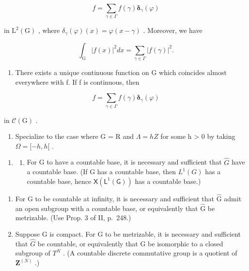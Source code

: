 \[
f = \sum_ {\gamma \in \Gamma} f (\gamma) \boldsymbol {\delta} _ {\gamma} (\varphi)
\]

in \(\mathrm{L}^2 (\mathrm{G})\) , where \(\delta_{\gamma}(\varphi)(x) = \varphi (x - \gamma)\) . Moreover, we have

\[
\int_ {\mathrm{G}} | f (x) | ^ {2} d x = \sum_ {\gamma \in \Gamma} | f (\gamma) | ^ {2}.
\]

\begin{enumerate}
\def\labelenumi{\alph{enumi})}
\setcounter{enumi}{4}
\tightlist
\item
  There exists a unique continuous function on G which coincides almost everywhere with f. If f is continuous, then
\end{enumerate}

\[
f = \sum_ {\gamma \in \Gamma} f (\gamma) \boldsymbol {\delta} _ {\gamma} (\varphi)
\]

in \(\mathcal{C}(\mathrm{G})\) .

\begin{enumerate}
\def\labelenumi{\alph{enumi})}
\setcounter{enumi}{5}
\tightlist
\item
  Specialize to the case where G = R and \(\Lambda = hZ\) for some h \textgreater{} 0 by taking \(\Omega = [-h, h[\) .
\end{enumerate}


\begin{enumerate}
\def\labelenumi{\arabic{enumi})}
\tightlist
\item
  \begin{enumerate}
  \def\labelenumii{\alph{enumii})}
  \tightlist
  \item
    For G to have a countable base, it is necessary and sufficient that \(\widehat{G}\) have a countable base. (If G has a countable base, then \(L^{1}(G)\) has a countable base, hence \(\mathsf{X}(\mathsf{L}^{1}(\mathsf{G}))\) has a countable base.)
  \end{enumerate}
\end{enumerate}

\begin{enumerate}
\def\labelenumi{\alph{enumi})}
\setcounter{enumi}{1}
\item
  For G to be countable at infinity, it is necessary and sufficient that \(\widehat{\mathrm{G}}\) admit an open subgroup with a countable base, or equivalently that \(\widehat{\mathrm{G}}\) be metrizable. (Use Prop. 3 of II, p.~248.)
\item
  Suppose G is compact. For G to be metrizable, it is necessary and sufficient that \(\widehat{G}\) be countable, or equivalently that G be isomorphic to a closed subgroup of \(T^{N}\) . (A countable discrete commutative group is a quotient of \(\mathbf{Z}^{(N)}\) .)
\end{enumerate}

